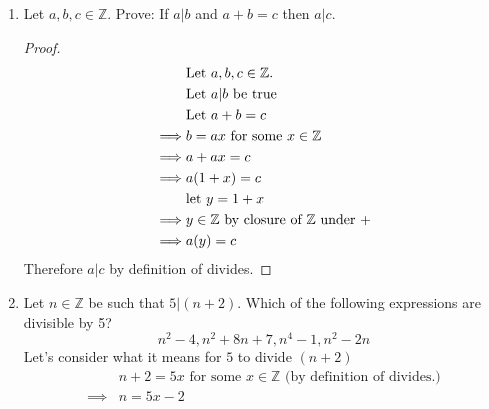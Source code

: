 \documentclass[11 pt]{article}
\theoremstyle{definition}
\theoremstyle{definition}
\def\ZZ{\mathbb{Z}}
\def\divides{\big |}
\begin{document}
\begin{enumerate}
\item Let $a, b, c \in \ZZ$.  Prove: If $a \divides b$ and $a + b = c$ then $a \divides c$.
    \begin{proof}
        \begin{align} \setcounter{equation}{0}
            &\text{Let $a,b,c \in \ZZ$.}\\\notag
            &\text{Let $a|b$ be true}\\\notag
            &\text{Let $a+b=c$ }\\\notag
            \implies &b=ax \text{ for some $x \in \ZZ$}\\
            \implies &a+ax=c\\
            \implies &a(1+x)=c\\
                     &\text{let $y=1+x$}\\
            \implies &\text{$y \in \ZZ$ by closure of $\ZZ$ under $+$}\\
            \implies &a(y) = c
        \end{align}
        Therefore $a|c$ by definition of divides.
    \end{proof}
    \pagebreak%
\item Let $n \in \ZZ$ be such that $5 \divides (n + 2)$.  Which of the following expressions are divisible by 5?
%
$$
n^2 - 4, n^2 + 8n + 7, n^4 - 1, n^2 - 2n
$$
%   
    Let's consider what it means for $5$ to divide $(n+2)$
    \begin{align*}
        &n+2=5x \text{ for some $x \in \ZZ$ (by definition of divides.)}\\
        \implies  &n=5x-2
    \end{align*}


\end{enumerate}
\end{document}
